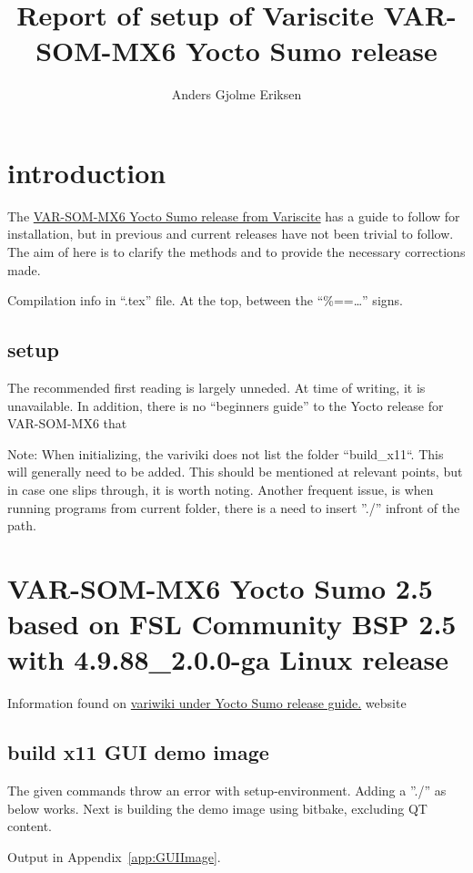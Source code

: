\documentclass[10pt]{article}
\begin{document}
\title{%
Report of setup of Variscite
\large
VAR-SOM-MX6 Yocto Sumo release
}

\author{Anders Gjolme Eriksen}

\section{introduction}

The \href{http://variwiki.com/index.php?title=VAR-SOM-MX6\_Yocto\&release=RELEASE\_SUMO\_V1.1\_VAR-SOM-MX6}{VAR-SOM-MX6 Yocto Sumo release from Variscite}
has a guide to follow for installation, but in previous and current releases have not been trivial to follow. The aim of here is to clarify the
methods and to provide the necessary corrections made.

Compilation info in ``.tex'' file. At the top, between the ``\%==\ldots'' signs.

\subsection{setup}

The recommended first reading is largely unneded. At time of writing, it is unavailable. In addition, there is no ``beginners guide''
to the Yocto release for VAR-SOM-MX6 that

Note: When initializing, the variviki does not list the folder ``build\_x11``. This will generally need to be added. This should be mentioned at relevant
points, but in case one slips through, it is worth noting. Another frequent issue, is when running programs from current folder, there is a need
to insert ''./'' infront of the path.


\section{VAR-SOM-MX6 Yocto Sumo 2.5 based on FSL Community BSP 2.5 with 4.9.88\_2.0.0-ga Linux release}
Information found on \href{http://variwiki.com/index.php?title=Yocto\_Build\_Release&release=RELEASE\_SUMO\_V1.1\_VAR-SOM-MX6}{variwiki under Yocto Sumo release guide.}
website

\subsection{build x11 GUI demo image}
The given commands throw an error with setup-environment. Adding a ''./'' as below works. Next is building the demo image using bitbake, excluding QT content.

Output in Appendix~\ref{app:GUIImage}.
\end{document}
